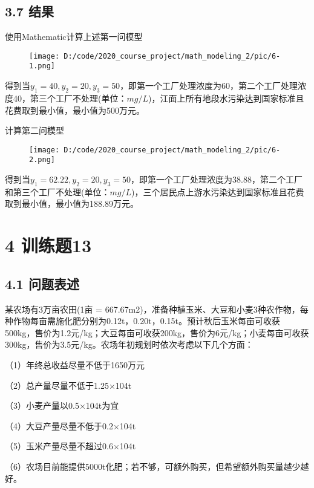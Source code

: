 \documentclass[bachelor,openany,oneside,color]{buaathesis}
\begin{document}
\hypertarget{header-n291}{%
\section{3.7 结果}\label{header-n291}}

使用Mathematic计算上述第一问模型

\begin{figure}
\centering
\texttt{[image: D:/code/2020\_course\_project/math\_modeling\_2/pic/6-1.png]}
\caption{}
\end{figure}

得到当\(y_1=40,y_2=20,y_3=50\)，即第一个工厂处理浓度为60，第二个工厂处理浓度40，第三个工厂不处理(单位：\(mg/L\))，江面上所有地段水污染达到国家标准且花费取到最小值，最小值为500万元。

计算第二问模型

\begin{figure}
\centering
\texttt{[image: D:/code/2020\_course\_project/math\_modeling\_2/pic/6-2.png]}
\caption{}
\end{figure}

得到当\(y_1=62.22,y_2=20,y_3=50\)，即第一个工厂处理浓度为38.88，第二个工厂和第三个工厂不处理(单位：\(mg/L\))，三个居民点上游水污染达到国家标准且花费取到最小值，最小值为188.89万元。

\hypertarget{header-n298}{%
\chapter{4 训练题13}\label{header-n298}}
\setcounter{table}{0}\setcounter{figure}{0}
\hypertarget{header-n299}{%
\section{4.1 问题表述}\label{header-n299}}

某农场有3万亩农田(1亩 =
667.67m2)，准备种植玉米、大豆和小麦3种农作物，每种作物每亩需施化肥分别为0.12t，0.20t，0.15t。预计秋后玉米每亩可收获500kg，售价为1.2元/kg；大豆每亩可收获200kg，售价为6元/kg；小麦每亩可收获300kg，售价为3.5元/kg。农场年初规划时依次考虑以下几个方面：

（1）年终总收益尽量不低于1650万元

（2）总产量尽量不低于1.25×104t

（3）小麦产量以0.5×104t为宜

（4）大豆产量尽量不低于0.2×104t

（5）玉米产量尽量不超过0.6×104t

（6）农场目前能提供5000t化肥；若不够，可额外购买，但希望额外购买量越少越好。
\end{document}
